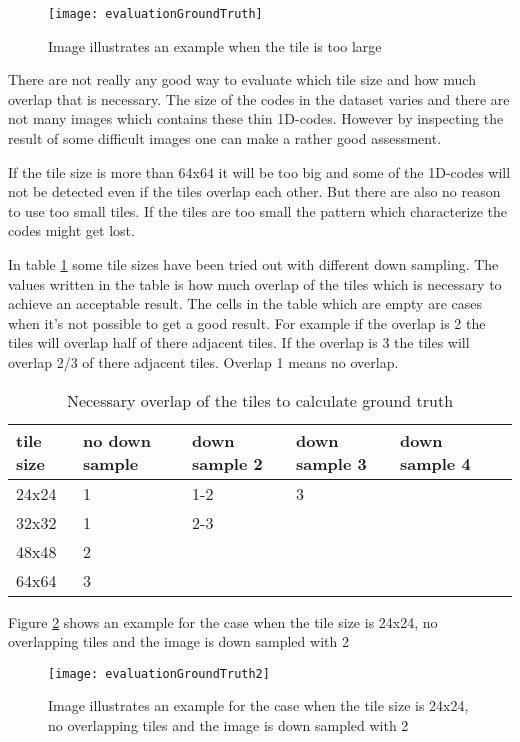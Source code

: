 \begin{figure}[H]
\centering
	\texttt{[image: evaluationGroundTruth]}
	\caption{Image illustrates an example when the tile is too large}
	\label{evaluationGroundTruth}
\end{figure}

There are not really any good way to evaluate which tile size and how much overlap that is necessary. The size of the codes in the dataset varies and there are not many images which contains these thin 1D-codes. However by inspecting the result of some difficult images one can make a rather good assessment. 

If the tile size is more than 64x64 it will be too big and some of the 1D-codes will not be detected even if the tiles overlap each other. But there are also no reason to use too small tiles. If the tiles are too small the pattern which characterize the codes might get lost.

In table \ref{table:overlap} some tile sizes have been tried out with different down sampling. The values written in the table is how much overlap of the tiles which is necessary to achieve an acceptable result. The cells in the table which are empty are cases when it's not possible to get a good result. For example if the overlap is 2 the tiles will overlap half of there adjacent tiles. If the overlap is 3 the tiles will overlap 2/3 of there adjacent tiles. Overlap 1 means no overlap. 

\begin{table}[H]
\begin{center}
     \begin{tabular}{ | l | l | l | l | l | p{5cm} |}
     \hline
     tile size & no down sample & down sample 2 & down sample 3 & down sample 4 \\ \hline
   	 24x24 & 1 & 1-2 & 3 & 	\\ \hline
     32x32 & 1 & 2-3 &   & 	\\ \hline
     48x48 & 2 &     &   &  \\ \hline
     64x64 & 3 &     &   &	\\ \hline
     \end{tabular}
\end{center}
\caption{Necessary overlap of the tiles to calculate ground truth}
\label{table:overlap}
\end{table}

Figure \ref{evaluationGroundTruth2} shows an example for the case when the tile size is 24x24, no overlapping tiles and the image is down sampled with 2
\begin{figure}[H]
\centering
	\texttt{[image: evaluationGroundTruth2]}
	\caption{Image illustrates an example for the case when the tile size is 24x24, no overlapping tiles and the image is down sampled with 2}
	\label{evaluationGroundTruth2}
\end{figure}

